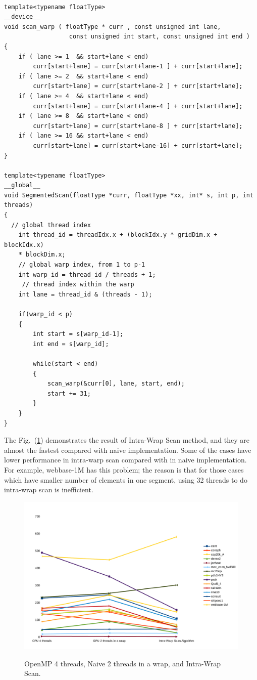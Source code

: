 \documentclass[preprint, prX, amsmath,amssymb]{revtex4-1}
\begin{document}
\begin{lstlisting}

template<typename floatType>
__device__
void scan_warp ( floatType * curr , const unsigned int lane, 
                  const unsigned int start, const unsigned int end )
{
    if ( lane >= 1  && start+lane < end)  
        curr[start+lane] = curr[start+lane-1 ] + curr[start+lane];
    if ( lane >= 2  && start+lane < end)  
        curr[start+lane] = curr[start+lane-2 ] + curr[start+lane]; 
    if ( lane >= 4  && start+lane < end)  
        curr[start+lane] = curr[start+lane-4 ] + curr[start+lane];
    if ( lane >= 8  && start+lane < end)  
        curr[start+lane] = curr[start+lane-8 ] + curr[start+lane];
    if ( lane >= 16 && start+lane < end)  
        curr[start+lane] = curr[start+lane-16] + curr[start+lane];
}

template<typename floatType>
__global__
void SegmentedScan(floatType *curr, floatType *xx, int* s, int p, int threads)
{
  // global thread index
    int thread_id = threadIdx.x + (blockIdx.y * gridDim.x + blockIdx.x) 
    * blockDim.x; 
    // global warp index, from 1 to p-1
    int warp_id = thread_id / threads + 1;
     // thread index within the warp
    int lane = thread_id & (threads - 1);

    if(warp_id < p)
    {
        int start = s[warp_id-1];
        int end = s[warp_id];

        while(start < end)
        {
            scan_warp(&curr[0], lane, start, end);
            start += 31;
        }
    }
}
\end{lstlisting}

The Fig.~(\ref{Final}) demonstrates the result of Intra-Wrap Scan method, and they are almost the fastest compared with naive implementation. Some of the cases have lower performance in intra-warp scan compared with in naive implementation. For example, webbase-1M has this problem; the reason is that for those cases which have smaller number of elements in one segment, using 32 threads to do intra-wrap scan is inefficient. 

\begin{figure}
  \includegraphics[width=15.2cm]{Final}\\
\caption{OpenMP 4 threads, Naive 2 threads in a wrap, and Intra-Wrap Scan.}
\label{Final}
\end{figure}
\end{document}
